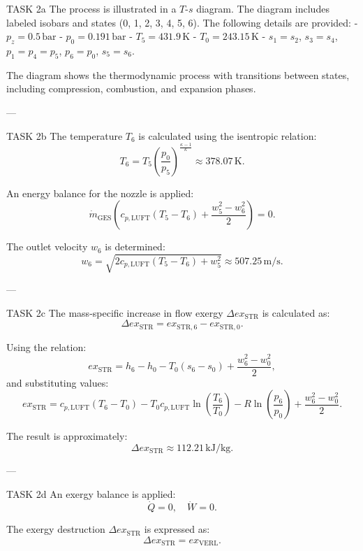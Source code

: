 TASK 2a  
The process is illustrated in a \( T \)-\( s \) diagram. The diagram includes labeled isobars and states (0, 1, 2, 3, 4, 5, 6). The following details are provided:  
- \( p_z = 0.5 \, \text{bar} \)  
- \( p_0 = 0.191 \, \text{bar} \)  
- \( T_5 = 431.9 \, \text{K} \)  
- \( T_0 = 243.15 \, \text{K} \)  
- \( s_1 = s_2 \), \( s_3 = s_4 \), \( p_1 = p_4 = p_5 \), \( p_6 = p_0 \), \( s_5 = s_6 \).  

The diagram shows the thermodynamic process with transitions between states, including compression, combustion, and expansion phases.  

---

TASK 2b  
The temperature \( T_6 \) is calculated using the isentropic relation:  
\[
T_6 = T_5 \left( \frac{p_0}{p_5} \right)^{\frac{\kappa - 1}{\kappa}} \approx 378.07 \, \text{K}.
\]  

An energy balance for the nozzle is applied:  
\[
\dot{m}_{\text{GES}} \left( c_{p,\text{LUFT}} (T_5 - T_6) + \frac{w_5^2 - w_6^2}{2} \right) = 0.
\]  

The outlet velocity \( w_6 \) is determined:  
\[
w_6 = \sqrt{2 c_{p,\text{LUFT}} (T_5 - T_6) + w_5^2} \approx 507.25 \, \text{m/s}.
\]  

---

TASK 2c  
The mass-specific increase in flow exergy \( \Delta ex_{\text{STR}} \) is calculated as:  
\[
\Delta ex_{\text{STR}} = ex_{\text{STR},6} - ex_{\text{STR},0}.
\]  

Using the relation:  
\[
ex_{\text{STR}} = h_6 - h_0 - T_0 (s_6 - s_0) + \frac{w_6^2 - w_0^2}{2},
\]  
and substituting values:  
\[
ex_{\text{STR}} = c_{p,\text{LUFT}} (T_6 - T_0) - T_0 c_{p,\text{LUFT}} \ln \left( \frac{T_6}{T_0} \right) - R \ln \left( \frac{p_6}{p_0} \right) + \frac{w_6^2 - w_0^2}{2}.
\]  

The result is approximately:  
\[
\Delta ex_{\text{STR}} \approx 112.21 \, \text{kJ/kg}.
\]  

---

TASK 2d  
An exergy balance is applied:  
\[
\dot{Q} = 0, \quad \dot{W} = 0.
\]  

The exergy destruction \( \Delta ex_{\text{STR}} \) is expressed as:  
\[
\Delta ex_{\text{STR}} = ex_{\text{VERL}}.
\]  